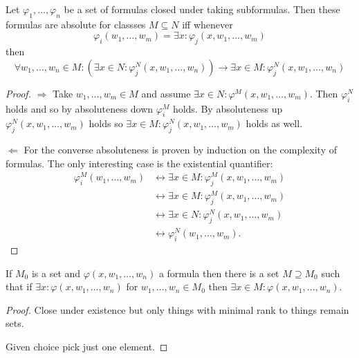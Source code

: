 \begin{proposition}
    Let \(\varphi_{1},\ldots,\varphi_{n}\) be a set of formulas closed under
    taking subformulas. Then these formulas are absolute for classses
    \(M\subseteq N\) iff whenever
    \[
        \varphi_{i}(w_{1},\ldots,w_{m})=\exists x:\varphi_{j}(x,w_{1},\ldots,w_{m})
    \]
    then
    \[
        \forall w_{1},\ldots,w_{n}\in M:(\exists x\in N:\varphi_{j}^{N}(x,w_{1},\ldots,w_{n}))\to\exists x\in M:\varphi_{j}^{N}(x,w_{1},\ldots,w_{n})
    \]

    \begin{proof}
        \(\Longrightarrow\) Take \(w_{1},\ldots,w_{m}\in M\) and assume
        \(\exists x\in N:\varphi^{M}(x,w_{1},\ldots,w_{m})\). Then
        \(\varphi_{i}^{N}\) holds and so by absoluteness down
        \(\varphi_{i}^{M}\) holds. By absoluteness up
        \(\varphi_{j}^{N}(x,w_{1},\ldots,w_{m})\) holds so
        \(\exists x\in M:\varphi_{j}^{N}(x,w_{1},\ldots,w_{m})\) holds as well.

        \(\Longleftarrow\) For the converse absoluteness is proven by induction
        on the complexity of formulas. The only interesting case is the
        existential quantifier:
        \begin{align*}
            \varphi_{i}^{M}(w_{1},\ldots,w_{m}) & \leftrightarrow\exists x\in M:\varphi_{j}^{M}(x,w_{1},\ldots,w_{m}) \\
                                                & \leftrightarrow\exists x\in M:\varphi_{j}^{M}(x,w_{1},\ldots,w_{m}) \\
                                                & \leftrightarrow\exists x\in N:\varphi_{j}^{N}(x,w_{1},\ldots,w_{m}) \\
                                                & \leftrightarrow\varphi_{i}^{N}(w_{1},\ldots,w_{m}).
        \end{align*}
    \end{proof}
\end{proposition}

\begin{proposition}
    If \(M_{0}\) is a set and \(\varphi(x,w_{1},\ldots,w_{n})\) a formula then
    there is a set \(M\supseteq M_{0}\) such that if \(\exists
    x:\varphi(x,w_{1},\ldots,w_{n})\) for \(w_{1},\ldots,w_{n}\in M_{0}\)
    then \(\exists x\in M:\varphi(x,w_{1},\ldots,w_{n})\).

    \begin{proof}
        Close under existence but only things with minimal rank to things remain
        sets.

        Given choice pick just one element.
    \end{proof}
\end{proposition}

